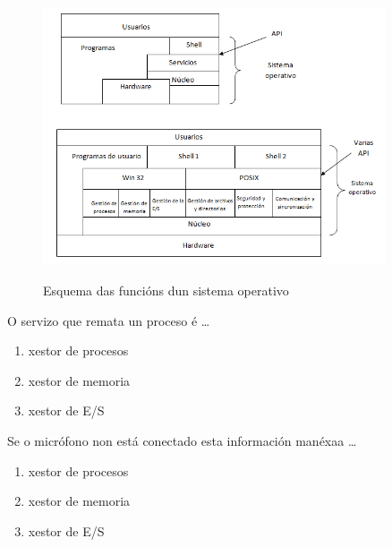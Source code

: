 \begin{figure} 
\begin{center}
\caption{Esquema das funcións dun sistema operativo}
\includegraphics[width=0.9\textwidth]{./debuxos/unid.png}
\label{servizos}
\end{center}
\end{figure}

\begin{diapo} \begin{frame}{O servizo que remata un proceso é   \dots} 
\begin{enumerate}
	\item xestor de procesos\pause
	\item xestor de memoria \pause
	\item xestor de E/S 
\end{enumerate} \end{frame}  \end{diapo}  
\begin{diapo}\begin{frame}{ Se o micrófono non está conectado esta información manéxaa   \dots}
\begin{enumerate}
	\item xestor de procesos\pause
	\item xestor de memoria \pause
	\item xestor de E/S 
\end{enumerate} \end{frame} \end{diapo}

